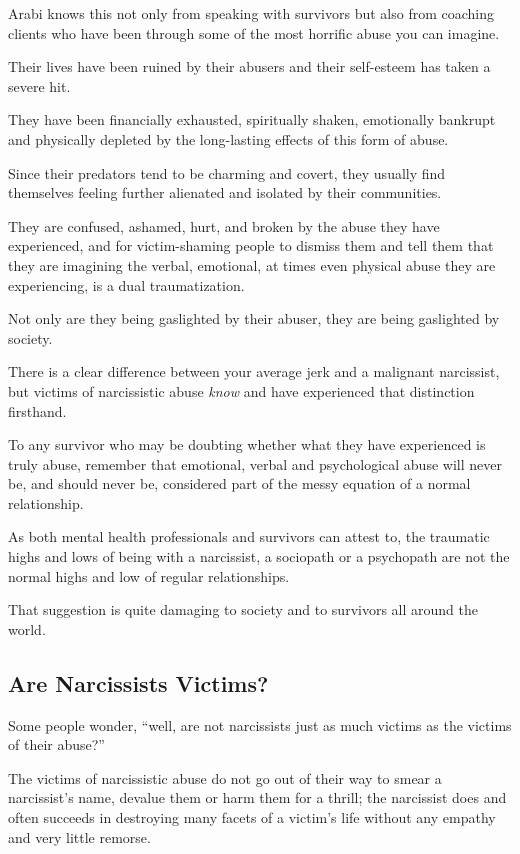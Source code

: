 \documentclass[oneside]{book}
\numberwithin{equation}{section}
\begin{document}
Arabi knows this not only from speaking with survivors but also from coaching clients who have been through some of the most horrific abuse you can imagine.

Their lives have been ruined by their abusers and their self-esteem has taken a severe hit.

They have been financially exhausted, spiritually shaken, emotionally bankrupt and physically depleted by the long-lasting effects of this form of abuse.

Since their predators tend to be charming and covert, they usually find themselves feeling further alienated and isolated by their communities.

%
They are confused, ashamed, hurt, and broken by the abuse they have experienced, and for victim-shaming people to dismiss them and tell them that they are imagining the verbal, emotional, at times even physical abuse they are experiencing, is a dual traumatization.

Not only are they being gaslighted by their abuser, they are being gaslighted by society.

There is a clear difference between your average jerk and a malignant narcissist, but victims of narcissistic abuse \textit{know} and have experienced that distinction firsthand.

%
To any survivor who may be doubting whether what they have experienced is truly abuse, remember that emotional, verbal and psychological abuse will never be, and should never be, considered part of the messy equation of a normal relationship.

As both mental health professionals and survivors can attest to, the traumatic highs and lows of being with a narcissist, a sociopath or a psychopath are not the normal highs and low of regular relationships.

That suggestion is quite damaging to society and to survivors all around the world.

\subsection{Are Narcissists Victims?}
Some people wonder, ``well, are not narcissists just as much victims as the victims of their abuse?''


The victims of narcissistic abuse do not go out of their way to smear a narcissist's name, devalue them or harm them for a thrill; the narcissist does and often succeeds in destroying many facets of a victim's life without any empathy and very little remorse.
\end{document}
